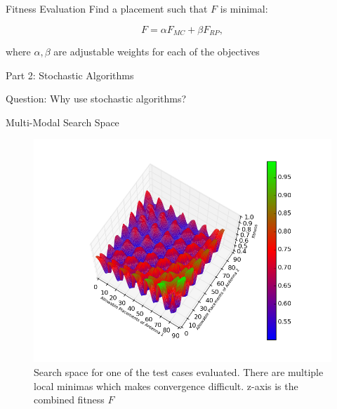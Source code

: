 \documentclass{beamer}
\begin{document}
\begin{frame}{Fitness Evaluation}
    Find a placement such that $F$ is minimal:
    \begin{tcolorbox}[colback=green!5]
        \begin{equation} \label{eq:optimal}
            F = \alpha F_{MC} + \beta F_{RP},
        \end{equation}
    \end{tcolorbox}
    where $\alpha, \beta$ are adjustable weights for each of the objectives 
\end{frame}

\begin{frame}{\null}
    \begin{tcolorbox}[colback=green!5]
        \centering\Huge
        Part 2: Stochastic Algorithms
    \end{tcolorbox}
\end{frame}
\begin{frame}{\null}
    \begin{tcolorbox}[colback=green!5]
        \centering
        Question: Why use stochastic algorithms?
    \end{tcolorbox}
\end{frame}

\begin{frame}[t]{Multi-Modal Search Space}
    \begin{figure}
        \vspace*{-0.35cm}
        \centering
        \includegraphics[scale=0.4]{../paper/FIG/tc1_ss}
        \caption*{Search space for one of the test cases evaluated. There are multiple local minimas which makes convergence difficult. z-axis is the combined fitness $F$}
    \end{figure}
\end{frame}
\end{document}

